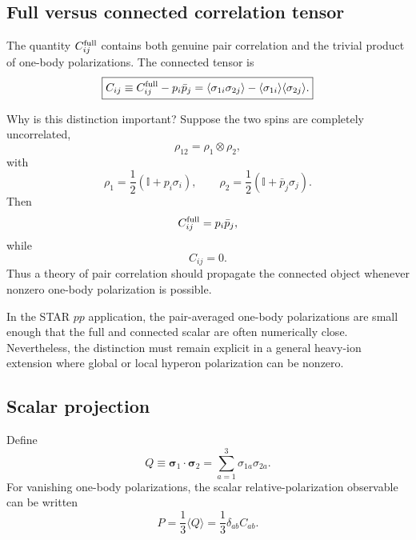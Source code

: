 \documentclass[11pt]{article}
\newcommand{\Id}{\mathbb I}
\begin{document}
\subsection{Full versus connected correlation tensor}

The quantity $C^{\rm full}_{ij}$ contains both genuine pair correlation and the trivial product of one-body polarizations. The connected tensor is
\begin{equation}
\boxed{
C_{ij}
\equiv
C^{\rm full}_{ij}-p_i\bar p_j
=
\langle\sigma_{1i}\sigma_{2j}\rangle
-
\langle\sigma_{1i}\rangle
\langle\sigma_{2j}\rangle.
}
\label{eq:Cconnected}
\end{equation}

Why is this distinction important? Suppose the two spins are completely uncorrelated,
\begin{equation}
\rho_{12}=\rho_1\otimes\rho_2,
\end{equation}
with
\begin{equation}
\rho_1=\frac12(\Id+p_i\sigma_i),
\qquad
\rho_2=\frac12(\Id+\bar p_j\sigma_j).
\end{equation}
Then
\begin{equation}
C^{\rm full}_{ij}=p_i\bar p_j,
\end{equation}
while
\begin{equation}
C_{ij}=0.
\end{equation}
Thus a theory of pair correlation should propagate the connected object whenever nonzero one-body polarization is possible.

In the STAR $pp$ application, the pair-averaged one-body polarizations are small enough that the full and connected scalar are often numerically close. Nevertheless, the distinction must remain explicit in a general heavy-ion extension where global or local hyperon polarization can be nonzero.

\subsection{Scalar projection}

Define
\begin{equation}
Q\equiv\bm\sigma_1\cdot\bm\sigma_2=\sum_{a=1}^{3}\sigma_{1a}\sigma_{2a}.
\end{equation}
For vanishing one-body polarizations, the scalar relative-polarization observable can be written
\begin{equation}
\boxed{
P=\frac13\langle Q\rangle
=\frac13\delta_{ab}C_{ab}.
}
\label{eq:Pscalar}
\end{equation}
\end{document}
